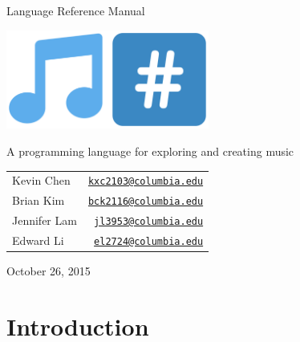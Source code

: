 \documentclass[11pt, onecolumn, letterpaper]{article}
\begin{document}
\lstset{style=nh}

\begin{titlepage}

\centering

{\Huge Language Reference Manual \par}
\vspace{3em}
\includegraphics[width=0.5\textwidth]{note-hashtag.pdf} \par
\vspace{0.4em}
{\Large A programming language for exploring and creating music \par}

\vfill

\begin{tabular}{ l r }
{\large Kevin Chen} & {\large \texttt{\href{mailto:kxc2103@columbia.edu}{kxc2103@columbia.edu}} } \\
{\large Brian Kim} & {\large \texttt{\href{mailto:bck2116@columbia.edu}{bck2116@columbia.edu}} } \\
{\large Jennifer Lam} & {\large \texttt{\href{mailto:jl3953@columbia.edu}{jl3953@columbia.edu}} } \\
{\large Edward Li} & {\large \texttt{\href{mailto:el2724@columbia.edu}{el2724@columbia.edu}} } \\
\end{tabular} \par
\vspace{1em}
{\large October 26, 2015 \par}

\end{titlepage}

\raggedright
\setlength{\parskip}{1.3ex plus 0.5ex minus 0.3ex}

\setcounter{page}{2}

\tableofcontents

\newpage

\section{Introduction}
\end{document}
